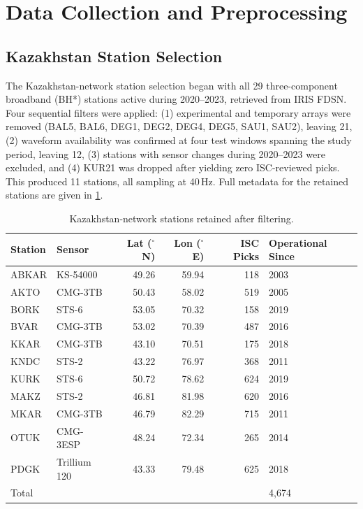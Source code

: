 
\section{Data Collection and Preprocessing}
\label{app:data}

\subsection{Kazakhstan Station Selection}
\label{app:kz_stations}

The Kazakhstan-network station selection began with all 29 three-component broadband (BH*) stations active during 2020--2023, retrieved from IRIS FDSN. Four sequential filters were applied: (1) experimental and temporary arrays were removed (BAL5, BAL6, DEG1, DEG2, DEG4, DEG5, SAU1, SAU2), leaving 21, (2) waveform availability was confirmed at four test windows spanning the study period, leaving 12, (3) stations with sensor changes during 2020--2023 were excluded, and (4) KUR21 was dropped after yielding zero ISC-reviewed picks. This produced 11 stations, all sampling at 40\,Hz. Full metadata for the retained stations are given in \cref{tab:stations}.

\begin{table}[h]
    \centering
    \caption{Kazakhstan-network stations retained after filtering.}
    \label{tab:stations}
    \small
    \begin{tabular}{@{}llrrrl@{}}
        \toprule
        Station & Sensor & Lat ($^\circ$N) & Lon ($^\circ$E) & ISC Picks & Operational Since \\
        \midrule
        ABKAR  & KS-54000          & 49.26 & 59.94 & 118  & 2003 \\
        AKTO   & CMG-3TB           & 50.43 & 58.02 & 519  & 2005 \\
        BORK   & STS-6             & 53.05 & 70.32 & 158  & 2019 \\
        BVAR   & CMG-3TB           & 53.02 & 70.39 & 487  & 2016 \\
        KKAR   & CMG-3TB           & 43.10 & 70.51 & 175  & 2018 \\
        KNDC   & STS-2             & 43.22 & 76.97 & 368  & 2011 \\
        KURK   & STS-6             & 50.72 & 78.62 & 624  & 2019 \\
        MAKZ   & STS-2             & 46.81 & 81.98 & 620  & 2016 \\
        MKAR   & CMG-3TB           & 46.79 & 82.29 & 715  & 2011 \\
        OTUK   & CMG-3ESP          & 48.24 & 72.34 & 265  & 2014 \\
        PDGK   & Trillium 120      & 43.33 & 79.48 & 625  & 2018 \\
        \midrule
        \multicolumn{5}{l}{Total} & 4{,}674 \\
        \bottomrule
    \end{tabular}
\end{table}

